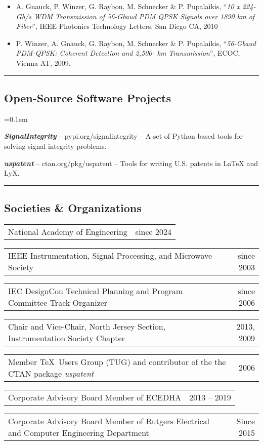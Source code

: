 \documentclass[10pt,letterpaper]{extarticle}
\makeatletter
\newenvironment{indentsection}[1]%
{\begin{list}{}%
	{\setlength{\leftmargin}{#1}}%
	\item[]%
}
{\end{list}}
\newcommand{\headerrow}[2]
{\begin{tabular*}{\linewidth}{l@{\extracolsep{\fill}}r}
	#1 &
	#2 \\
\end{tabular*}}
\makeatother
\begin{document}
\begin{indentsection}{-1em}
\begin{itemize}
\item A. Gnauck, P. Winzer, G. Raybon, M. Schnecker \& P. Pupalaikis, “\emph{10 x 224-Gb/s WDM Transmission of 56-Gbaud PDM QPSK Signals over 1890 km of Fiber}”, IEEE Photonics Technology Letters, San Diego CA, 2010 
\item P. Winzer, A. Gnauck, G. Raybon, M. Schnecker \& P. Pupalaikis, “\emph{56-Gbaud PDM-QPSK: Coherent Detection and 2,500- km Transmission}”, ECOC, Vienna AT, 2009. 
\end{itemize}\end{indentsection}
\hrule
\vspace{-1em}\subsection*{\Large Open-Source Software Projects}\vspace{-0.5em}
	\parskip=0.1em
\begin{flushleft} 
\vspace{0.2em}\begin{indentsection}{-1em}\begin{itemize*}
		\item \textbf{\emph{SignalIntegrity}} -- \textsf{pypi.org/signalintegrity} -- A set of Python based tools for solving signal integrity problems.
		\item \textbf{\emph{uspatent}} -- \textsf{ctan.org/pkg/uspatent} -- Tools for writing U.S. patents in LaTeX and LyX.
\end{itemize*}\end{indentsection}\end{flushleft}
\vspace{0.2em}
\hrule
\vspace{-1em}\subsection*{\Large Societies \& Organizations}\vspace{-0.5em}
\headerrow
		{National Academy of Engineering}
		{since 2024}
\headerrow
		{IEEE Instrumentation, Signal Processing,  and Microwave Society}
		{since 2003}
\headerrow
		{IEC DesignCon Technical Planning and Program Committee Track Organizer}
		{since 2006}
\headerrow
		{Chair and Vice-Chair, North Jersey Section, Instrumentation Society Chapter}
		{2013, 2009}
\headerrow
		{Member \TeX~Users Group (TUG) and contributor of the the CTAN package \emph{uspatent}}
		{2006}
\headerrow
		{Corporate Advisory Board Member of ECEDHA}
		{2013 -- 2019}
\headerrow
		{Corporate Advisory Board Member of Rutgers Electrical and Computer Engineering Department}
		{Since 2015}
\end{document}
